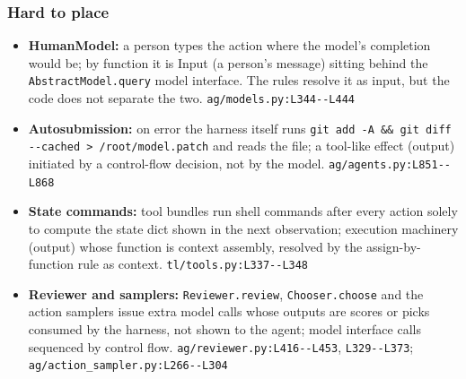 \subsubsection*{Hard to place}
\begin{itemize}
\item \textbf{HumanModel:} a person types the action where the model's completion would be; by function it is Input (a person's message) sitting behind the \texttt{AbstractModel.\allowbreak{}query} model interface. The rules resolve it as input, but the code does not separate the two. \texttt{ag/\allowbreak{}models.\allowbreak{}py:\allowbreak{}L344-\allowbreak{}-\allowbreak{}L444}
\item \textbf{Autosubmission:} on error the harness itself runs \texttt{git add -\allowbreak{}A \&\& git diff -\allowbreak{}-\allowbreak{}cached > /\allowbreak{}root/\allowbreak{}model.\allowbreak{}patch} and reads the file; a tool-like effect (output) initiated by a control-flow decision, not by the model. \texttt{ag/\allowbreak{}agents.\allowbreak{}py:\allowbreak{}L851-\allowbreak{}-\allowbreak{}L868}
\item \textbf{State commands:} tool bundles run shell commands after every action solely to compute the state dict shown in the next observation; execution machinery (output) whose function is context assembly, resolved by the assign-by-function rule as context. \texttt{tl/\allowbreak{}tools.\allowbreak{}py:\allowbreak{}L337-\allowbreak{}-\allowbreak{}L348}
\item \textbf{Reviewer and samplers:} \texttt{Reviewer.\allowbreak{}review}, \texttt{Chooser.\allowbreak{}choose} and the action samplers issue extra model calls whose outputs are scores or picks consumed by the harness, not shown to the agent; model interface calls sequenced by control flow. \texttt{ag/\allowbreak{}reviewer.\allowbreak{}py:\allowbreak{}L416-\allowbreak{}-\allowbreak{}L453}, \texttt{L329-\allowbreak{}-\allowbreak{}L373}; \texttt{ag/\allowbreak{}action\_\allowbreak{}sampler.\allowbreak{}py:\allowbreak{}L266-\allowbreak{}-\allowbreak{}L304}
\end{itemize}

